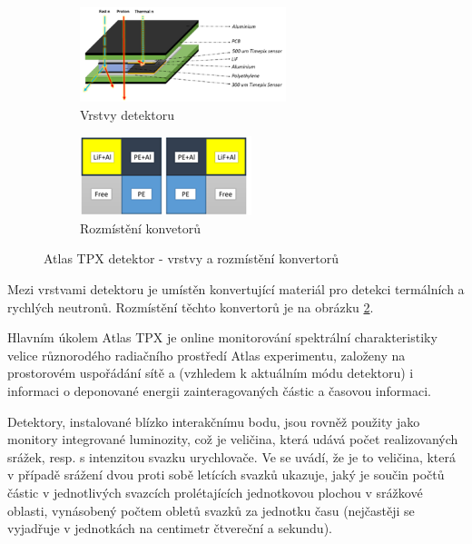 \begin{figure}[th]
	\begin{center}
		\begin{subfigure}{6cm}
			\includegraphics[width=6cm]{figures/tpx_lay.png}	
			\caption{Vrstvy detektoru}
			\label{fig:tpx_detector_layers}
		\end{subfigure}
		\hspace{0.5cm}
		\begin{subfigure}{5cm}
			\includegraphics[width=5cm]{figures/tpx_conv.png}
			\caption{Rozmístění konvetorů}
			\label{fig:tpx_detector_convertors}
		\end{subfigure}
		\caption{Atlas TPX detektor - vrstvy a rozmístění konvertorů}
		\label{fig:tpx_detector}
	\end{center}			
\end{figure}

Mezi vrstvami detektoru je umístěn konvertující materiál pro detekci termálních a rychlých neutronů. Rozmístění těchto konvertorů je na obrázku \ref{fig:tpx_detector_convertors}.

Hlavním úkolem Atlas TPX je online monitorování spektrální charakteristiky velice různorodého radiačního prostředí Atlas experimentu, založeny na prostorovém uspořádání sítě a (vzhledem k aktuálním módu detektoru) i informaci o deponované energii zainteragovaných částic a časovou informaci. 


Detektory, instalované blízko interakčnímu bodu, jsou rovněž použity jako monitory integrované luminozity, což je veličina, která udává počet realizovaných srážek, resp. s intenzitou svazku urychlovače. Ve \cite{wagner:o_lhc} se uvádí, že je to veličina, která v případě srážení dvou proti sobě letících svazků ukazuje, jaký je součin počtů částic v jednotlivých svazcích prolétajících jednotkovou plochou v srážkové oblasti, vynásobený počtem obletů svazků za jednotku času (nejčastěji se vyjadřuje v jednotkách na centimetr čtvereční a sekundu).

